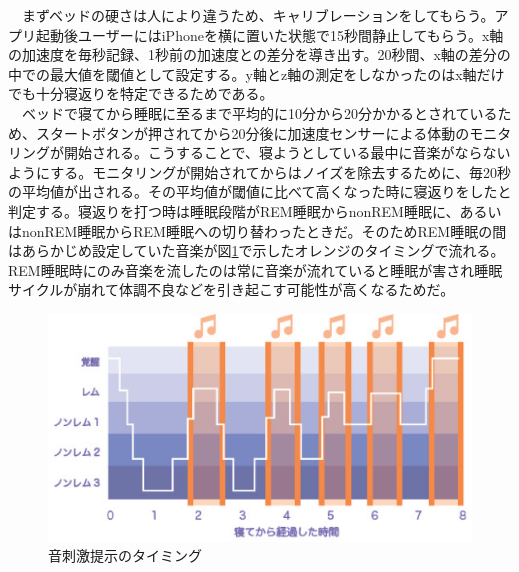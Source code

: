 　まずベッドの硬さは人により違うため、キャリブレーションをしてもらう。アプリ起動後ユーザーにはiPhoneを横に置いた状態で15秒間静止してもらう。x軸の加速度を毎秒記録、1秒前の加速度との差分を導き出す。20秒間、x軸の差分の中での最大値を閾値として設定する。y軸とz軸の測定をしなかったのはx軸だけでも十分寝返りを特定できるためである。\\

　ベッドで寝てから睡眠に至るまで平均的に10分から20分かかるとされているため、スタートボタンが押されてから20分後に加速度センサーによる体動のモニタリングが開始される。こうすることで、寝ようとしている最中に音楽がならないようにする。モニタリングが開始されてからはノイズを除去するために、毎20秒の平均値が出される。その平均値が閾値に比べて高くなった時に寝返りをしたと判定する。寝返りを打つ時は睡眠段階がREM睡眠からnonREM睡眠に、あるいはnonREM睡眠からREM睡眠への切り替わったときだ\cite{negaeri}。そのためREM睡眠の間はあらかじめ設定していた音楽が図\ref{melodyGraph}で示したオレンジのタイミングで流れる。REM睡眠時にのみ音楽を流したのは常に音楽が流れていると睡眠が害され睡眠サイクルが崩れて体調不良などを引き起こす可能性が高くなるためだ。

\begin{figure}[htbp]
\begin{center}
\includegraphics[width=15cm]{eps/remNonrem.eps}
\caption{音刺激提示のタイミング}
\label{melodyGraph}
\end{center}
\end{figure}


